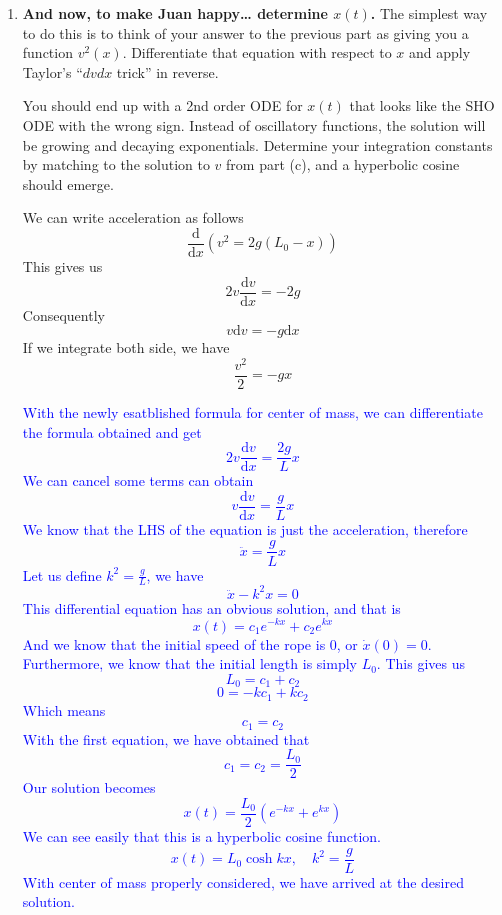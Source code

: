 \documentclass[12pt]{article}
\newcommand{\dydx}[2]{\frac{\text{d} #1}{\text{d} #2}}
\newcommand{\paren}[1]{\left( #1 \right)}
\begin{document}
\begin{enumerate}
    \textcolor{blue}{The center of mass where gravity is acting on in our model is not considered in this expression for energy. Therefore the correct expression is not achieved. If we are considering the correct expression where the center of mass of the rope is taken into account, we should be able to establish
    \[
    v^2(t) = \frac{g}{L}\paren{x^2 - L_0^2}
    \]}
    
    \item \textbf{And now, to make Juan happy… determine $x(t)$.} The simplest way to do this is to think of your answer to the previous part as giving you a function $v^2(x)$. Differentiate that equation with respect to $x$ and apply Taylor’s “$dvdx$ trick” in reverse.
    
    You should end up with a 2nd order ODE for $x(t)$ that looks like the SHO ODE with the wrong sign. Instead of oscillatory functions, the solution will be growing and decaying exponentials. Determine your integration constants by matching to the solution to $v$ from part (c), and a hyperbolic cosine should emerge.

    We can write  acceleration as follows
    \[
    \dydx{}{x}\paren{
    v^2 = 2g(L_0-x)
    }
    \]
    This gives us
    \[
    2v\dydx{v}{x} = -2g
    \]
    Consequently
    \[
    v\text{d}v = -g\text{d}x
    \]
    If we integrate both side, we have
    \[
    \frac{v^2}{2} = -gx
    \]

    \textcolor{blue}{With the newly esatblished formula for center of mass, we can differentiate the formula obtained and get
    \[
    2v\dydx{v}{x} = \frac{2g}{L}x
    \]
    We can cancel some terms can obtain
    \[
    v\dydx{v}{x} = \frac{g}{L}x
    \]
    We know that the LHS of the equation is just the acceleration, therefore
    \[
    \ddot{x} = \frac{g}{L}x
    \]
    Let us define $k^2 = \frac{g}{L}$, we have
    \[
    \ddot{x} -k^2x = 0
    \]
    This differential equation has an obvious solution, and that is
    \[
    x(t) = c_1e^{-kx}+c_2e^{kx}
    \]
    And we know that the initial speed of the rope is 0, or $\dot x(0) = 0$. Furthermore, we know that the initial length is simply $L_0$. This gives us
    \[
    L_0 = c_1 + c_2
    \]
    \[
    0 = -kc_1 + kc_2
    \]
    Which means
    \[
    c_1 = c_2
    \]
    With the first equation, we have obtained that
    \[
    c_1 = c_2 = \frac{L_0}{2}
    \]
    Our solution becomes
    \[
    x(t) = \frac{L_0}{2}\paren{e^{-kx}+e^{kx}}
    \]
    We can see easily that this is a hyperbolic cosine function.
    \[
    x(t) = L_0\cosh kx,\quad k^2 = \frac{g}{L}
    \]
    With center of mass properly considered, we have arrived at the desired solution. }
    

\end{enumerate}
\end{document}
